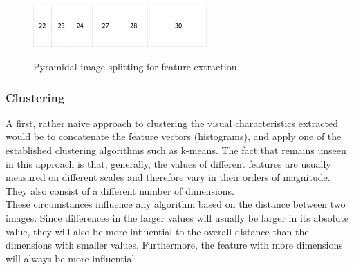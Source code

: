\begin{figure}[h]
\includegraphics[width=0.19\textwidth]{images/partitioning3v.pdf}
\includegraphics[width=0.19\textwidth]{images/partitioning2v.pdf}
\includegraphics[width=0.19\textwidth]{images/partitioning1v.pdf}
\caption{Pyramidal image splitting for feature extraction}
\label{fig_partitioning}
\end{figure}


\subsubsection{Clustering}
A first, rather naive approach to clustering the visual characteristics extracted would be to concatenate the feature vectors (histograms), and apply one of the established clustering algorithms such as k-means. The fact that remains unseen in this approach is that, generally, the values of different features are usually measured on different scales and therefore vary in their orders of magnitude. They also consist of a different number of dimensions. \\
These circumstances influence any algorithm based on the distance between two images. Since differences in the larger values will usually be larger in its absolute value, they will also be more influential to the overall distance than the dimensions with smaller values. Furthermore, the feature with more dimensions will always be more influential.

